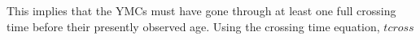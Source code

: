 This implies that the YMCs must have gone through at least one full crossing time before their presently observed age. Using the crossing time equation, $t\textit{cross}$
